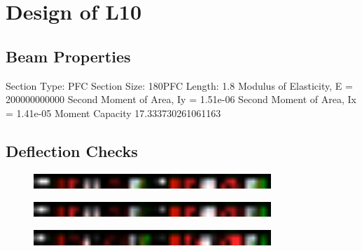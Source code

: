 \documentclass{article}%
\begin{document}
%
\normalsize%
\section*{Design of L10}%
\label{sec:DesignofL10}%
\subsection*{Beam Properties}%
\label{subsec:BeamProperties}%

%
Section Type:	PFC%
\newline%
\newline%
%
Section Size:	180PFC%
\newline%
\newline%
%
Length:	1.8%
\newline%
\newline%
%
Modulus of Elasticity, E =	200000000000%
\newline%
\newline%
%
Second Moment of Area, Iy =	1.51e-06%
\newline%
\newline%
%
Second Moment of Area, Ix =	1.41e-05%
\newline%
\newline%
%
Moment Capacity	17.333730261061163%
\newline%
\newline%
%
\subsection*{Deflection Checks}%
\label{subsec:DeflectionChecks}%

%


\begin{figure}[htbp]%
\centering%
\includegraphics[width=0.8\textwidth]{Fig0.png}%
\end{figure}

%


\begin{figure}[htbp]%
\centering%
\includegraphics[width=0.8\textwidth]{Fig1.png}%
\end{figure}

%


\begin{figure}[htbp]%
\centering%
\includegraphics[width=0.8\textwidth]{Fig2.png}%
\end{figure}
\end{document}
